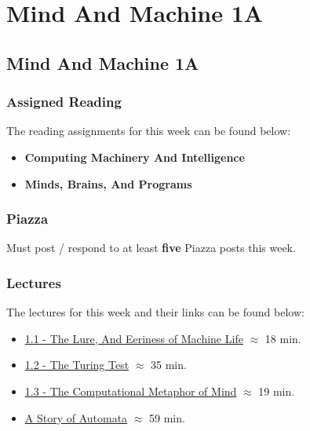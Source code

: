 \clearpage

\newcommand{\ChapTitle}{Mind And Machine 1A}
\newcommand{\SectionTitle}{Mind And Machine 1A}

\chapter{\ChapTitle}
\section{\SectionTitle}

\subsection{Assigned Reading}

The reading assignments for this week can be found below:

\begin{itemize}
    \item \textbf{Computing Machinery And Intelligence}
    \item \textbf{Minds, Brains, And Programs}
\end{itemize}

\subsection{Piazza}

Must post / respond to at least \textbf{five} Piazza posts this week.

\subsection{Lectures}

The lectures for this week and their links can be found below:

\begin{itemize}
    \item \href{https://www.youtube.com/watch?v=Ns8VEMUpZtc}{1.1 - The Lure, And Eeriness of Machine Life} $\approx$ 18 min.
    \item \href{https://www.youtube.com/watch?v=FrlctL4vEzo}{1.2 - The Turing Test} $\approx$ 35 min.
    \item \href{https://www.youtube.com/watch?v=WRQ7CwIO030}{1.3 - The Computational Metaphor of Mind} $\approx$ 19 min.
    \item \href{https://www.youtube.com/watch?v=YAg66jrvpHA}{A Story of Automata} $\approx$ 59 min.
\end{itemize}

